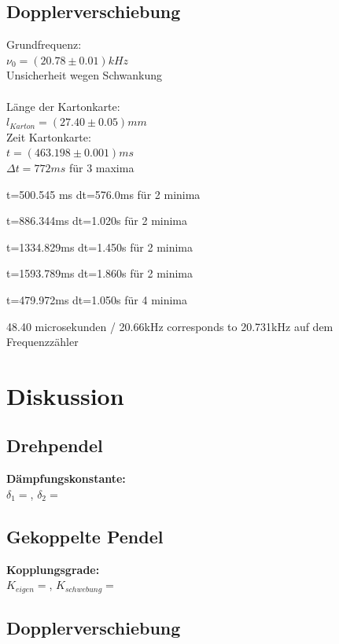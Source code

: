 \documentclass{article}
\begin{document}
\subsection{Dopplerverschiebung}
Grundfrequenz:\\
$\nu_0=(20.78 \pm 0.01)\si{kHz}$\\
Unsicherheit wegen Schwankung\\
\\
Länge der Kartonkarte:\\
$l_{Karton}=(27.40 \pm 0.05)\si{mm}$\\

Zeit Kartonkarte:\\
$t=(463.198 \pm 0.001)\si{ms}$\\

$\Delta t=772ms$ für 3 maxima

t=500.545 ms
dt=576.0ms für 2 minima

t=886.344ms
dt=1.020s für 2 minima

t=1334.829ms
dt=1.450s für 2 minima

t=1593.789ms
dt=1.860s für 2 minima

t=479.972ms
dt=1.050s für 4 minima

48.40 microsekunden / 20.66kHz corresponds to 20.731kHz auf dem Frequenzzähler

\section{Diskussion}
\subsection*{Drehpendel}
\textbf{Dämpfungskonstante:}\\
$\delta_1=$, $\delta_2=$

\subsection*{Gekoppelte Pendel}
\textbf{Kopplungsgrade:}\\
$K_{eigen}=$, $K_{schwebung}=$
\subsection*{Dopplerverschiebung}



\end{document}
